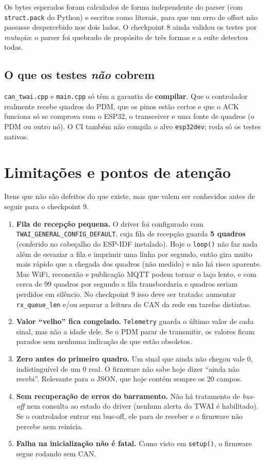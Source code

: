 \documentclass[11pt,a4paper]{article}
\begin{document}
Os bytes esperados foram calculados de forma independente do parser (com \texttt{struct.pack} do Python) e escritos como literais, para que um erro de offset não passasse despercebido nos dois lados. O checkpoint 8 ainda validou os testes por \emph{mutação}: o parser foi quebrado de propósito de três formas e a suíte detectou todas.

\subsection{O que os testes \emph{não} cobrem}

\texttt{can\_twai.cpp} e \texttt{main.cpp} só têm a garantia de \textbf{compilar}. Que o controlador realmente recebe quadros do PDM, que os pinos estão certos e que o ACK funciona só se comprova com o ESP32, o transceiver e uma fonte de quadros (o PDM ou outro nó). O CI também não compila o alvo \texttt{esp32dev}; roda só os testes nativos.

\section{Limitações e pontos de atenção}

Itens que não são defeitos do que existe, mas que valem ser conhecidos antes de seguir para o checkpoint 9.

\begin{enumerate}
    \item \textbf{Fila de recepção pequena.} O driver foi configurado com \texttt{TWAI\_GENERAL\_CONFIG\_DEFAULT}, cuja fila de recepção guarda \textbf{5 quadros} (conferido no cabeçalho do ESP-IDF instalado). Hoje o \texttt{loop()} não faz nada além de esvaziar a fila e imprimir uma linha por segundo, então gira muito mais rápido que a chegada dos quadros (não medido) e não há risco aparente. Mas WiFi, reconexão e publicação MQTT podem tornar o laço lento, e com cerca de 99 quadros por segundo a fila transbordaria e quadros seriam perdidos em silêncio. No checkpoint 9 isso deve ser tratado: aumentar \texttt{rx\_queue\_len} e/ou separar a leitura do CAN da rede em tarefas distintas.
    \item \textbf{Valor ``velho'' fica congelado.} \texttt{Telemetry} guarda o último valor de cada sinal, mas não a idade dele. Se o PDM parar de transmitir, os valores ficam parados sem nenhuma indicação de que estão obsoletos.
    \item \textbf{Zero antes do primeiro quadro.} Um sinal que ainda não chegou vale 0, indistinguível de um 0 real. O firmware não sabe hoje dizer ``ainda não recebi''. Relevante para o JSON, que hoje contém sempre os 20 campos.
    \item \textbf{Sem recuperação de erros do barramento.} Não há tratamento de \emph{bus-off} nem consulta ao estado do driver (nenhum alerta do TWAI é habilitado). Se o controlador entrar em bus-off, ele para de receber e o firmware não percebe nem reinicia.
    \item \textbf{Falha na inicialização não é fatal.} Como visto em \texttt{setup()}, o firmware segue rodando sem CAN.
\end{enumerate}
\end{document}

